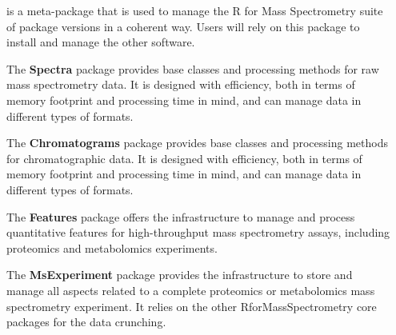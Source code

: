 \documentclass[final]{beamer}
\newcommand{\bpkg}[1]{{\textbf{#1}}}
\begin{document}
\begin{frame}[fragile]
\begin{columns}[T]
\begin{column}{.2\textwidth}
    \end{column}

    \begin{column}{.4\textwidth}

      \begin{block}{}
        \justifying \bpkg{RforMassSpectrometry} is a meta-package that
        is used to manage the R for Mass Spectrometry suite of package
        versions in a coherent way. Users will rely on this package to
        install and manage the other software.
      \end{block}

      \vspace{1cm}

      \begin{block}{}
        \justifying The \bpkg{Spectra} package provides base classes
        and processing methods for raw mass spectrometry data. It is
        designed with efficiency, both in terms of memory footprint
        and processing time in mind, and can manage data in different
        types of formats.
      \end{block}

      \vspace{1cm}

      \begin{block}{}
        \justifying The \bpkg{Chromatograms} package provides base
        classes and processing methods for chromatographic data. It
        is designed with efficiency, both in terms of memory footprint
        and processing time in mind, and can manage data in different
        types of formats.
      \end{block}

      \vspace{1cm}

      \begin{block}{}
        \justifying The \bpkg{Features} package offers the
        infrastructure to manage and process quantitative features for
        high-throughput mass spectrometry assays, including proteomics
        and metabolomics experiments.
      \end{block}

      \vspace{1cm}

      \begin{block}{}
        \justifying The \bpkg{MsExperiment} package provides the
        infrastructure to store and manage all aspects related to a
        complete proteomics or metabolomics mass spectrometry
        experiment. It relies on the other RforMassSpectrometry core
        packages for the data crunching.
      \end{block}


\end{column}
\end{columns}
\end{frame}
\end{document}
